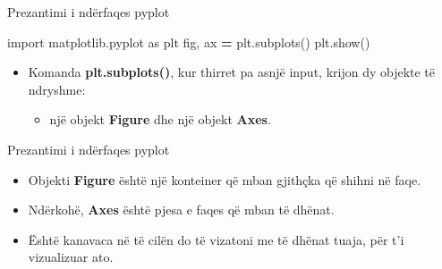 \documentclass[
  ignorenonframetext,
]{beamer}
\newenvironment{Shaded}{\begin{snugshade}}{\end{snugshade}}
\newcommand{\ImportTok}[1]{#1}
\newcommand{\NormalTok}[1]{#1}
\newcommand{\OperatorTok}[1]{\textcolor[rgb]{0.81,0.36,0.00}{\textbf{#1}}}
\providecommand{\tightlist}{%
  \setlength{\itemsep}{0pt}\setlength{\parskip}{0pt}}
\begin{document}
\begin{frame}[fragile]{Prezantimi i ndërfaqes pyplot}
\protect\hypertarget{prezantimi-i-nduxebrfaqes-pyplot-3}{}

\begin{Shaded}
\begin{Highlighting}[]
\ImportTok{import}\NormalTok{ matplotlib.pyplot }\ImportTok{as}\NormalTok{ plt}
\NormalTok{fig, ax }\OperatorTok{=}\NormalTok{ plt.subplots()}
\NormalTok{plt.show()}
\end{Highlighting}
\end{Shaded}

\begin{itemize}
\item
  Komanda \textbf{plt.subplots()}, kur thirret pa asnjë input, krijon dy
  objekte të ndryshme:

  \begin{itemize}
  \tightlist
  \item
    një objekt \textbf{Figure} dhe një objekt \textbf{Axes}.
  \end{itemize}
\end{itemize}
\end{frame}

\begin{frame}{Prezantimi i ndërfaqes pyplot}
\protect\hypertarget{prezantimi-i-nduxebrfaqes-pyplot-4}{}
\begin{itemize}
\item
  Objekti \textbf{Figure} është një konteiner që mban gjithçka që shihni
  në faqe.
\item
  Ndërkohë, \textbf{Axes} është pjesa e faqes që mban të dhënat.
\item
  Është kanavaca në të cilën do të vizatoni me të dhënat tuaja, për t'i
  vizualizuar ato.
\end{itemize}
\end{frame}
\end{document}
